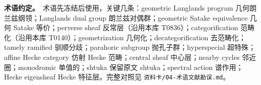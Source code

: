 \documentclass[UTF8, a4paper, 12pt, fontset=fandol, scheme=chinese]{ctexart}
\begin{document}
\textbf{术语约定。}\ 术语先冻结后使用，关键几条：geometric Langlands program 几何朗兰兹纲领；Langlands dual group 朗兰兹对偶群；geometric Satake equivalence 几何 Satake 等价；perverse sheaf 反常层（沿用本库 T0836）；categorification 范畴化（沿用本库 T0140）；geometrization 几何化；decategorification 去范畴化；tamely ramified 驯顺分歧；parahoric subgroup 抛孔子群；hyperspecial 超特殊；affine Hecke category 仿射 Hecke 范畴；central sheaf 中心层；nearby cycles 邻近圈；monodromic 单值的；shtuka 保留原文 shtuka；spectral action 谱作用；Hecke eigensheaf Hecke 特征层。完整对照见 \verb|资料卡/04-术语文献勘误.md|。

\newpage
\tableofcontents
\newpage














\end{document}
